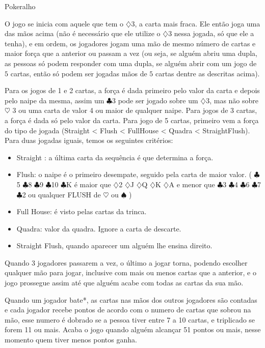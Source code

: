 \begin{subsecao}{Pokeralho}
\begin{itemize}
\end{itemize}

O jogo se inicia com aquele que tem o $\diamondsuit$3, a carta mais fraca. Ele
então joga uma das mãos acima (não é necessário que ele utilize
o $\diamondsuit$3 nessa jogada, só que ele a tenha), e em ordem, os jogadores
jogam uma mão de mesmo número de cartas e maior força que a anterior ou passam
a vez (ou seja, se alguém abriu uma dupla, as pessoas só podem responder com
uma dupla, se alguém abrir com um jogo de $5$ cartas, então só podem ser
jogadas mãos de $5$ cartas dentre as descritas acima). 

Para os jogos de 1 e 2 cartas, a força é dada primeiro pelo valor da carta e
depois pelo naipe da mesma, assim um $\clubsuit$3  pode ser jogado sobre
um $\diamondsuit$3, mas não sobre $\heartsuit$ 3 ou uma carta de valor 4 ou
maior de qualquer naipe. Para jogos de 3 cartas, a força é dada só pelo valor
da carta. Para jogo de 5 cartas, primeiro vem a força do tipo de
jogada (Straight < Flush < FullHouse < Quadra < StraightFlush). Para duas
jogadas iguais, temos os seguintes critérios:
\begin{itemize}
	\item Straight : a última carta da sequência é que determina a força.
	\item Flush: o naipe é o primeiro desempate, seguido pela carta de maior
valor.  ( $\clubsuit$5 $\clubsuit$8 $\clubsuit$9 $\clubsuit$10 $\clubsuit$K é
maior que $\diamondsuit$2 $\diamondsuit$J $\diamondsuit$Q $\diamondsuit$K
$\diamondsuit$A e menor que $\clubsuit$3 $\clubsuit$4 $\clubsuit$6 $\clubsuit$7
$\clubsuit$2 ou qualquer FLUSH de $\heartsuit$  ou $\spadesuit$  )
	\item Full House: é visto pelas cartas da trinca.	
	\item Quadra: valor da quadra. Ignore a carta de descarte.
	\item Straight Flush, quando aparecer um alguém lhe ensina direito.
\end{itemize}

Quando 3 jogadores passarem a vez, o último a jogar torna, podendo escolher
qualquer mão para jogar, inclusive com mais ou menos cartas que a anterior, e o
jogo prossegue assim até que alguém acabe com todas as cartas da sua mão. 

Quando um jogador bate*, as cartas nas mãos dos outros jogadores são contadas e
cada jogador recebe pontos de acordo com o numero de cartas que sobrou na mão,
esse numero é dobrado se a pessoa tiver entre 7 a 10 cartas, e triplicado se
forem 11 ou mais. Acaba o jogo quando alguém alcançar 51 pontos ou mais, nesse
momento quem tiver menos pontos ganha.


\end{subsecao}

